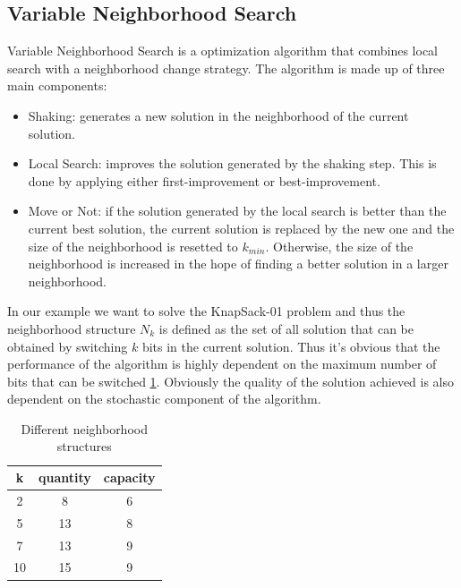 \subsection{Variable Neighborhood Search}
Variable Neighborhood Search is a optimization algorithm that combines local search with a neighborhood change strategy. The algorithm is made up of three main components:
\begin{itemize}
    \item Shaking: generates a new solution in the neighborhood of the current solution.
    \item Local Search: improves the solution generated by the shaking step. This is done by applying either first-improvement or best-improvement.
    \item Move or Not: if the solution generated by the local search is better than the current best solution, the current solution is replaced by the new one and the size of the neighborhood is resetted to $k_{min}$. Otherwise, the size of the neighborhood is increased in the hope of finding a better solution in a larger neighborhood.
\end{itemize}

In our example we want to solve the KnapSack-01 problem and  thus the neighborhood structure $N_k$ is defined as the set of all solution that can be obtained by switching $k$ bits in the current solution. Thus it's obvious that the performance of the algorithm is highly dependent on the maximum number of bits that can be switched \ref{tab:neighborhood}. Obviously the quality of the solution achieved is also dependent on the stochastic component of the algorithm.
\begin{table}[H]
    \centering
    \begin{tabular}{c||c |c}
        k  & quantity & capacity \\ \hline
        2  & 8        & 6        \\
        5  & 13       & 8        \\
        7  & 13       & 9        \\
        10 & 15       & 9        \\
    \end{tabular}
    \caption{Different neighborhood structures}
    \label{tab:neighborhood}
\end{table}

